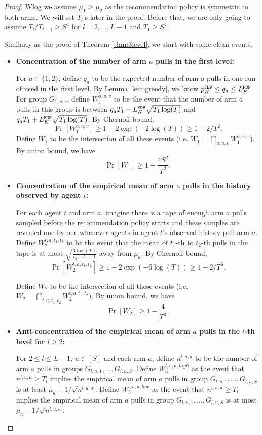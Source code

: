 \begin{proof}
Wlog we assume $\mu_1 \geq \mu_2$ as the recommendation policy is symmetric to both arms. We will set $T_l$'s later in the proof. Before that, we are only going to assume $T_l / T_{l-1} \geq S^4$ for $l=2,...,L-1$ and $T_1 \geq S^4$. 

Similarly as the proof of Theorem \ref{thm:3level}, we start with some clean events.

\begin{itemize}
\item  \textbf{Concentration of the number of arm $a$ pulls in the first level:} 

For $a \in \{1,2\}$, define $q_a$ to be the expected number of arm $a$ pulls in one run of \ALGG used in the first level. By Lemma \ref{lem:greedy}, we know $p^\mathtt{FDP}_K \leq q_a \leq L^\mathtt{FDP}_K$ For group $G_{1,u,v}$, define $W_1^{a,u,v}$ to be the event that the number of arm $a$ pulls in this group is between $q_a T_1- L^\mathtt{FDP}_K \sqrt{T_1\log(T)}$ and $q_a T_1 + L^\mathtt{FDP}_K \sqrt{T_1\log(T)}$. By Chernoff bound,
\[
\Pr[W_1^{a,u,v}] \geq 1-2\exp(-2\log(T)) \geq 1-2/T^2.
\]
Define $W_1$ to be the intersection of all these events (i.e. $W_1 = \bigcap_{a,u,v}W_1^{a,u,v}$). By union bound, we have
\[
\Pr[W_1] \geq 1- \frac{4S^2}{T^2}.
\]


\item \textbf{Concentration of the empirical mean of arm $a$ pulls in the history observed by agent $t$:}

 For each agent $t$ and arm $a$, imagine there is a tape of enough arm $a$ pulls sampled before the recommendation policy starts and these samples are revealed one by one whenever agents in agent $t$'s observed history pull arm $a$.  Define $W_2^{t,a,t_1,t_2}$ to be the event that the mean of $t_1$-th to $t_2$-th pulls in the tape is at most $\sqrt{\frac{3\log(T)}{t_2-t_1+1}}$ away from $\mu_a$. By Chernoff bound, 
\[
\Pr[W_2^{t,a,t_1,t_2}] \geq 1 - 2\exp(-6\log(T)) \geq 1- 2/T^6.
\]

Define $W_2$ to be the intersection of all these events (i.e. $W_2 = \bigcap_{t,a,t_1,t_2} W_2^{t,a,t_1,t_2}$). By union bound, we have
\[
\Pr[W_2] \geq 1- \frac{4}{T^3}.
\]


\item \textbf{Anti-concentration of the empirical mean of arm $a$ pulls in the $l$-th level  for $l \geq 2$:}

For $2\leq l \leq L-1$, $u\in [S]$ and each arm $a$, define $n^{l,u,a}$ to be the number of arm $a$ pulls in groups $G_{l,u,1},...,G_{l,u,S}$. Define $W_3^{l,u,a,high}$ as the event that $n^{l,u,a} \geq T_l$ implies the empirical mean of arm $a$ pulls in group $G_{l,u,1},...,G_{l,u,S}$ is at least $\mu_a + 1/\sqrt{n^{l,u,a}}$. Define $W_3^{l,u,a,low}$ as the event that $n^{l,u,a} \geq T_l$ implies the empirical mean of arm $a$ pulls in group $G_{l,u,1},...,G_{l,u,S}$ is at most $\mu_a - 1/\sqrt{n^{l,u,a}}$.


\end{itemize}
\end{proof}
